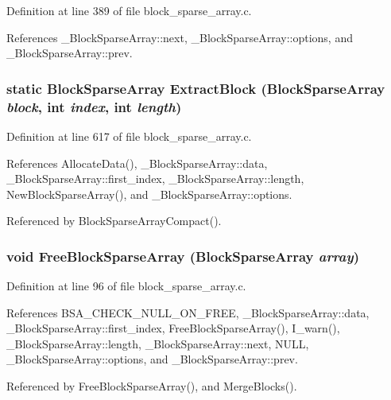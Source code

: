 Definition at line 389 of file block\_\-sparse\_\-array.c.

References \_\-Block\-Sparse\-Array::next, \_\-Block\-Sparse\-Array::options, and \_\-Block\-Sparse\-Array::prev.
\subsubsection{\setlength{\rightskip}{0pt plus 5cm}static \bf{Block\-Sparse\-Array} Extract\-Block (\bf{Block\-Sparse\-Array} {\em block}, int {\em index}, int {\em length})\hspace{0.3cm}{\tt  [static]}}\label{block__sparse__array_8c_a548621584dd685e3899f74ea057b6a4}




Definition at line 617 of file block\_\-sparse\_\-array.c.

References Allocate\-Data(), \_\-Block\-Sparse\-Array::data, \_\-Block\-Sparse\-Array::first\_\-index, \_\-Block\-Sparse\-Array::length, New\-Block\-Sparse\-Array(), and \_\-Block\-Sparse\-Array::options.

Referenced by Block\-Sparse\-Array\-Compact().
\subsubsection{\setlength{\rightskip}{0pt plus 5cm}void Free\-Block\-Sparse\-Array (\bf{Block\-Sparse\-Array} {\em array})}\label{block__sparse__array_8c_7291c7747788fe0ae7e0bd8a0284f852}




Definition at line 96 of file block\_\-sparse\_\-array.c.

References BSA\_\-CHECK\_\-NULL\_\-ON\_\-FREE, \_\-Block\-Sparse\-Array::data, \_\-Block\-Sparse\-Array::first\_\-index, Free\-Block\-Sparse\-Array(), I\_\-warn(), \_\-Block\-Sparse\-Array::length, \_\-Block\-Sparse\-Array::next, NULL, \_\-Block\-Sparse\-Array::options, and \_\-Block\-Sparse\-Array::prev.

Referenced by Free\-Block\-Sparse\-Array(), and Merge\-Blocks().
